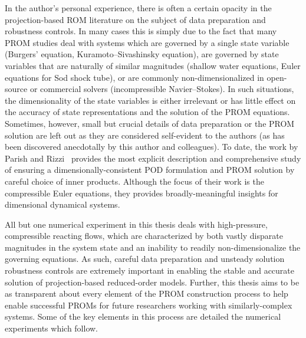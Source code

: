 In the author's personal experience, there is often a certain opacity in the projection-based ROM literature on the subject of data preparation and robustness controls. In many cases this is simply due to the fact that many PROM studies deal with systems which are governed by a single state variable (Burgers' equation, Kuramoto--Sivashinsky equation), are governed by state variables that are naturally of similar magnitudes (shallow water equations, Euler equations for Sod shock tube), or are commonly non-dimensionalized in open-source or commercial solvers (incompressible Navier--Stokes). In such situations, the dimensionality of the state variables is either irrelevant or has little effect on the accuracy of state representations and the solution of the PROM equations. Sometimes, however, small but crucial details of data preparation or the PROM solution are left out as they are considered self-evident to the authors (as has been discovered anecdotally by this author and colleagues). To date, the work by Parish and Rizzi~\cite{Parish2022} provides the most explicit description and comprehensive study of ensuring a dimensionally-consistent POD formulation and PROM solution by careful choice of inner products. Although the focus of their work is the compressible Euler equations, they provides broadly-meaningful insights for dimensional dynamical systems.

All but one numerical experiment in this thesis deals with high-pressure, compressible reacting flows, which are characterized by both vastly disparate magnitudes in the system state and an inability to readily non-dimensionalize the governing equations. As such, careful data preparation and unsteady solution robustness controls are extremely important in enabling the stable and accurate solution of projection-based reduced-order models. Further, this thesis aims to be as transparent about every element of the PROM construction process to help enable successful PROMs for future researchers working with similarly-complex systems. Some of the key elements in this process are detailed the numerical experiments which follow.